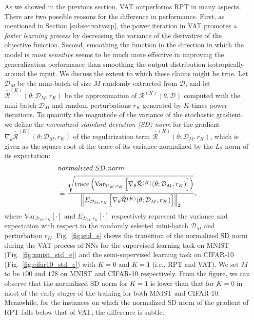 \documentclass[10pt,journal,compsoc]{IEEEtran}
\begin{document}
As we showed in the previous section, VAT outperforms RPT in many aspects. There are two possible reasons for the difference in performance. 
First, as mentioned in Section \ref{subsec:vatvsrp}, the power iteration in VAT promotes a \textit{faster learning process} by decreasing the variance of the derivative of the objective function. 
Second, smoothing the function in the direction in which the model is \textit{most sensitive} seems to be much more effective in improving the generalization performance than smoothing the output distribution isotropically around the input.  
We discuss the extent to which these claims might be true.
Let $\mathcal{D}_{M}$ be the mini-batch of size $M$ randomly extracted from $\mathcal{D}$, and let $\hat{\mathcal{R}}^{(K)}(\theta;\mathcal{D}_{M}, r_K)$ be the approximation of $\mathcal{R}^{(K)}(\theta, \mathcal{D})$ computed with the mini-batch $\mathcal{D}_{M}$ and random perturbations $r_K$ generated by $K$-times power iterations. 
To quantify the magnitude of the variance of the stochastic gradient, we define the \textit{normalized standard deviation (SD) norm} for the gradient $\nabla_{\theta}\hat{\mathcal{R}}^{(K)}(\theta;\mathcal{D}_{M},r_K)$ of the regularization term $\hat{\mathcal{R}}^{(K)}(\theta;\mathcal{D}_{M},r_K)$, which is given as the square root of the trace of its variance normalized by the $L_2$ norm of its expectation:
\begin{align}
&{normalized~SD~norm} \nonumber\\
&\equiv \frac{\sqrt{{\rm{trace}}\left(\textrm{Var}_{\mathcal{D}_{M},r_K}\left[\nabla_{\theta}\hat{\mathcal{R}}^{(K)}(\theta;\mathcal{D}_{M},r_{K})\right]\right)}}
{\left\|E_{\mathcal{D}_{M},r_K}\left[\nabla_{\theta}\hat{\mathcal{R}}^{(K)}(\theta;\mathcal{D}_{M},r_{K})\right]\right\|_2},
\end{align}
where $\textrm{Var}_{\mathcal{D}_{M},r_K}[\cdot]$ and $E_{\mathcal{D}_{M},r_K}[\cdot]$ respectively represent the variance and expectation with respect to the randomly selected mini-batch $\mathcal{D}_{M}$ and perturbation $r_K$.
Fig.~\ref{fig:std_e} shows the transition of the normalized SD norm during the VAT process of NNs for the supervised learning task on MNIST (Fig.~\ref{fig:mnist_std_e}) and the semi-supervised learning task on CIFAR-10 (Fig.~\ref{fig:cifar10_std_e}) with $K=0$ and $K=1$ (i.e., RPT and VAT).
We set $M$ to be $100$ and $128$ on MNIST and CIFAR-10 respectively. 
From the figure, we can observe that the normalized SD norm for $K=1$  is lower than that for $K=0$ in most of the early stages of the training for both MNIST and CIFAR-10. Meanwhile, for the instances on which the normalized SD norm of the gradient of RPT falls below that of VAT, the difference is subtle. 
\end{document}
